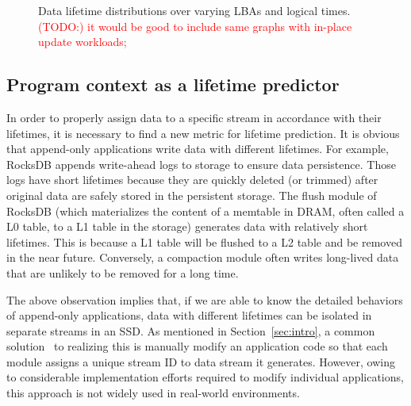 \begin{figure}[t]
	\centering
	\vspace{-10pt}
	\caption{
		Data lifetime distributions over varying LBAs and logical times.
		\textcolor{red}{(TODO:) it would be good to include same graphs with
		in-place update workloads;}}
		\label{fig:lba_lifetime}
	\vspace{-15pt}
\end{figure}

\vspace{-5pt}
\subsection{Program context as a lifetime predictor}

In order to properly assign data to a specific stream in accordance with their
lifetimes, it is necessary to find a new metric for lifetime prediction.  It is
obvious that append-only applications write data with different lifetimes.  For
example, RocksDB appends write-ahead logs to storage to ensure data
persistence.  Those logs have short lifetimes because they are quickly deleted
(or trimmed) after original data are safely stored in the persistent storage.
The flush module of RocksDB (which materializes the content of a memtable in
DRAM, often called a L0 table, to a L1 table in the storage) generates data
with relatively short lifetimes. This is because a L1 table will be flushed to
a L2 table and be removed in the near future. Conversely, a compaction module
often writes long-lived data that are unlikely to be removed for a long time.

The above observation implies that, if we are able to know the detailed
behaviors of append-only applications, data with different lifetimes can be
isolated in separate streams in an SSD. As mentioned in Section~\ref{sec:intro}, a
common solution~\cite{MultiStream} to realizing this is manually modify an
application code so that each module assigns a unique stream ID to data stream
it generates. However, owing to considerable implementation efforts
required to modify individual applications, this approach is not widely used in
real-world environments.

